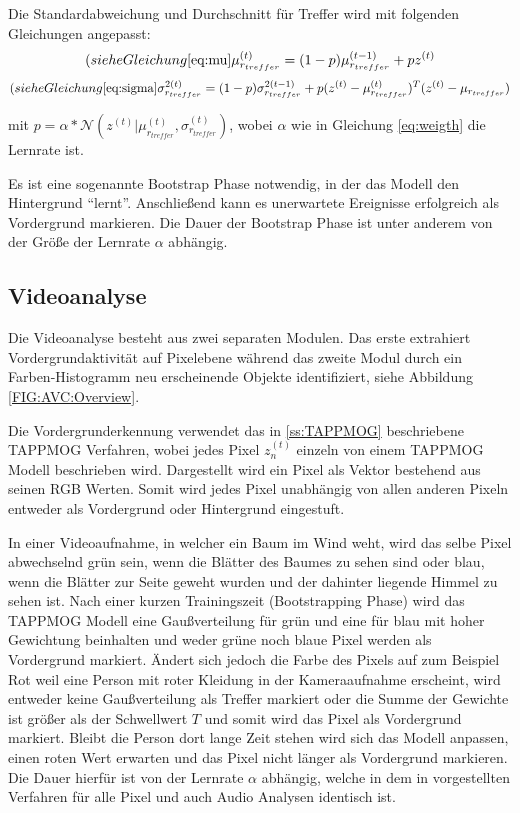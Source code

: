 Die Standardabweichung und Durchschnitt für Treffer wird mit folgenden Gleichungen angepasst:
\begin{equation}
(siehe Gleichung \ref{eq:mu}
\mu_{r_{treffer}}^{(t)} = (1-p)\mu_{r_{treffer}}^{(t-1)} + pz^{(t)}
\end{equation}
\begin{equation}
(siehe Gleichung \ref{eq:sigma}
\sigma_{r_{treffer}}^{2(t)} = (1-p)\sigma_{r_{treffer}}^{2(t-1)} + p (z^{(t)} - \mu_{r_{treffer}}^{(t)})^T (z^{(t)} - \mu_{r_{treffer}})
\end{equation}

mit $p = \alpha * \mathcal{N}(z^{(t)} | \mu_{r_{treffer}}^{(t)}, \sigma_{r_{treffer}}^{(t)} )$, wobei $\alpha$ wie in Gleichung \ref{eq:weigth} die Lernrate ist.

Es ist eine sogenannte Bootstrap Phase notwendig, in der das Modell den Hintergrund ``lernt''. Anschließend kann es unerwartete Ereignisse erfolgreich als Vordergrund markieren. Die Dauer der Bootstrap Phase ist unter anderem von der Größe der Lernrate $\alpha$ abhängig.

\subsection{Videoanalyse}

Die Videoanalyse besteht aus zwei separaten Modulen. Das erste extrahiert Vordergrundaktivität auf Pixelebene während das zweite Modul durch ein Farben-Histogramm neu erscheinende Objekte identifiziert, siehe Abbildung \ref{FIG:AVC:Overview}.

Die Vordergrunderkennung verwendet das in \ref{ss:TAPPMOG} beschriebene TAPPMOG Verfahren, wobei jedes Pixel $z_n^{(t)}$ einzeln von einem TAPPMOG Modell beschrieben wird. Dargestellt wird ein Pixel als Vektor bestehend aus seinen RGB Werten. Somit wird jedes Pixel unabhängig von allen anderen Pixeln entweder als Vordergrund oder Hintergrund eingestuft.

In einer Videoaufnahme, in welcher ein Baum im Wind weht, wird das selbe Pixel abwechselnd grün sein, wenn die Blätter des Baumes zu sehen sind oder blau, wenn die Blätter zur Seite geweht wurden und der dahinter liegende Himmel zu sehen ist. Nach einer kurzen Trainingszeit (Bootstrapping Phase) wird das TAPPMOG Modell eine Gaußverteilung für grün und eine für blau mit hoher Gewichtung beinhalten und weder grüne noch blaue Pixel werden als Vordergrund markiert. Ändert sich jedoch die Farbe des Pixels auf zum Beispiel Rot weil eine Person mit roter Kleidung in der Kameraaufnahme erscheint, wird entweder keine Gaußverteilung als Treffer markiert oder die Summe der Gewichte ist größer als der Schwellwert $T$ und somit wird das Pixel als Vordergrund markiert. Bleibt die Person dort lange Zeit stehen wird sich das Modell anpassen, einen roten Wert erwarten und das Pixel nicht länger als Vordergrund markieren. Die Dauer hierfür ist von der Lernrate $\alpha$ abhängig, welche in dem in \cite{CBM07} vorgestellten Verfahren für alle Pixel und auch Audio Analysen identisch ist.

